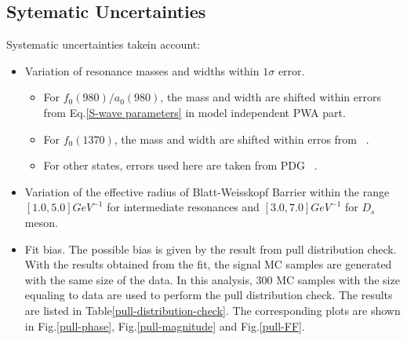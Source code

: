 \subsection{Sytematic Uncertainties}
\par{
    Systematic uncertainties takein account:
    \begin{itemize}
        \item \uppercase\expandafter{} Variation of resonance masses and widths within $1\sigma$ error.
            \begin{itemize}
                \item For $f_{0}(980) /a_{0}(980)$, the mass and width are shifted within errors from Eq.\ref{S-wave parameters} in model independent PWA part.
                \item For $f_{0}(1370)$, the mass and width are shifted within erros from ~\cite{para-f01370}.
                \item For other states, errors used here are taken from PDG ~\cite{PDG2018}.
            \end{itemize}
        \item \uppercase\expandafter{} Variation of the effective radius of Blatt-Weisskopf Barrier within the range $\left[1.0, 5.0\right] GeV^{-1}$ for intermediate resonances and  $\left[3.0, 7.0\right] GeV^{-1}$ for $D_{s}$ meson. 
        \item \uppercase\expandafter{} Fit bias. The possible bias is given by the result from pull distribution check. 
            With the results obtained from the fit, the signal MC samples are generated with the same size of the data. In this analysis, 300 MC samples with the size equaling to data are used to perform the pull distribution check.
            The results are listed in Table\ref{pull-distribution-check}.
            The corresponding plots are shown in Fig.\ref{pull-phase}, Fig.\ref{pull-magnitude} and Fig.\ref{pull-FF}.
    \end{itemize}
    
}
